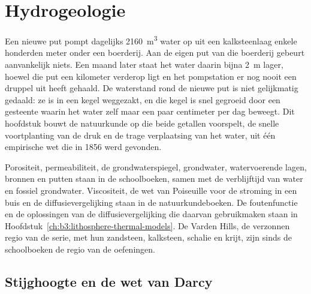 \chapter{Hydrogeologie}\label{ch:b3:hydrogeology}

Een nieuwe put pompt dagelijks \qty{2160}{m^3} water op uit een kalksteenlaag
enkele honderden meter onder een boerderij. Aan de eigen put van die boerderij gebeurt
aanvankelijk niets. Een maand later staat het water daarin bijna \qty{2}{m} lager, hoewel
die put een kilometer verderop ligt en het pompstation er nog nooit een druppel uit heeft gehaald. De
waterstand rond de nieuwe put is niet gelijkmatig gedaald: ze is in een kegel weggezakt,
en die kegel is snel gegroeid door een gesteente waarin het water zelf maar een paar
centimeter per dag beweegt. Dit hoofdstuk bouwt de natuurkunde op die beide getallen
voorspelt, de snelle voortplanting van de druk en de trage verplaatsing van het water,
uit één empirische wet die in 1856 werd gevonden.

\begin{recall}
Porositeit, permeabiliteit, de grondwaterspiegel, grondwater, watervoerende lagen,
bronnen en putten staan in de schoolboeken, samen met de verblijftijd van water en
fossiel grondwater. Viscositeit, de wet van Poiseuille voor de stroming in een buis
en de diffusievergelijking staan in de natuurkundeboeken. De foutenfunctie en
de oplossingen van de diffusievergelijking die daarvan gebruikmaken staan in
Hoofdstuk~\ref{ch:b3:lithosphere-thermal-models}. De Varden Hills, de
verzonnen regio van de serie, met hun zandsteen, kalksteen, schalie en krijt,
zijn sinds de schoolboeken de regio van de oefeningen.
\end{recall}

\section{Stijghoogte en de wet van Darcy}\label{sec:b3:hydrogeology:darcy}

